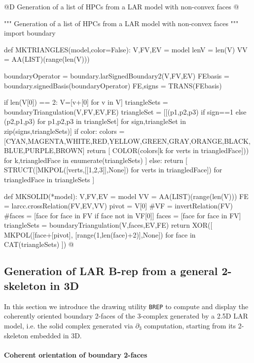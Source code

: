\documentclass[11pt,oneside]{article}    %
\begin{document}
@D Generation of a list of HPCs from a LAR model with non-convex faces
@{""" Generation of a list of HPCs from a LAR model with non-convex faces """
import boundary

def MKTRIANGLES(model,color=False):
    V,FV,EV = model
    lenV = len(V)
    VV = AA(LIST)(range(len(V)))
    
    boundaryOperator = boundary.larSignedBoundary2(V,FV,EV)
    FEbasis = boundary.signedBasis(boundaryOperator)
    FE,signs = TRANS(FEbasis)
    
    if len(V[0]) == 2: V=[v+[0] for v in V]
    triangleSets = boundaryTriangulation(V,FV,EV,FE)
    triangleSet = [[(p1,p2,p3) if sign==1 else (p2,p1,p3) for p1,p2,p3 in triangleSet] 
                    for sign,triangleSet in zip(signs,triangleSets)]
    if color:
        colors = [CYAN,MAGENTA,WHITE,RED,YELLOW,GREEN,GRAY,ORANGE,BLACK,BLUE,PURPLE,BROWN]
        return [ COLOR(colors[k%
            for verts in triangledFace])) for k,triangledFace in enumerate(triangleSets) ]
    else:
        return [ STRUCT([MKPOL([verts,[[1,2,3]],None]) for verts in triangledFace])
                for triangledFace in triangleSets ]

def MKSOLID(*model): 
    V,FV,EV = model
    VV = AA(LIST)(range(len(V)))
    FE = larcc.crossRelation(FV,EV,VV)
    pivot = V[0]
    #VF = invertRelation(FV) 
    #faces = [face for face in FV if face not in VF[0]]
    faces = [face for face in FV]
    triangleSets = boundaryTriangulation(V,faces,EV,FE)
    return XOR([ MKPOL([face+[pivot], [range(1,len(face)+2)],None])
        for face in CAT(triangleSets) ])
@}


\subsection{Generation of LAR B-rep from a general 2-skeleton in 3D}

In this section we introduce the drawing utility \texttt{BREP} to compute and display the coherently oriented boundary 2-faces of the 3-complex generated by a 2.5D LAR model, i.e. the solid complex generated via $\partial_3$ computation, starting from its 2-skeleton embedded in 3D.

\paragraph{Coherent orientation of boundary 2-faces}
\end{document}
